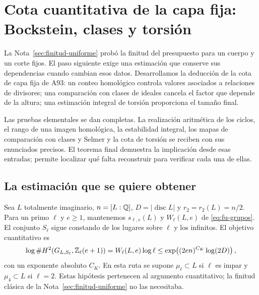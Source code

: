 \section{Cota cuantitativa de la capa fija: Bockstein, clases y torsión}
\label{sec:capa-fija}

La Nota~\ref{sec:finitud-uniforme} probó la finitud del presupuesto
para un cuerpo y un corte fijos. El paso siguiente exige una estimación
que conserve sus dependencias cuando cambian esos datos. Desarrollamos
la deducción de la cota de capa fija de A93: un conteo homológico
controla valores asociados a relaciones de divisores; una comparación
con clases de ideales cancela el factor que depende de la altura;
una estimación integral de torsión proporciona el tamaño final.

Las pruebas elementales se dan completas. La realización aritmética de
los ciclos, el rango de una imagen homológica, la estabilidad integral,
los mapas de comparación con clases y Selmer y la cota de torsión
se reciben con sus enunciados precisos. El teorema final demuestra
la implicación desde esas entradas; permite localizar qué falta
reconstruir para verificar cada una de ellas.


\subsection{La estimación que se quiere obtener}

Sea $L$ totalmente imaginario, $n=[L:\mathbb{Q}]$, $D=|\operatorname{disc}L|$
y $r_2=r_2(L)=n/2$. Para un primo $\ell$ y $e\ge1$, mantenemos
$s_{\ell,e}(L)$ y $W_\ell(L,e)$ de \eqref{eq:fu-grupos}.
El conjunto $S_\ell$ sigue constando de los lugares sobre $\ell$
y los infinitos. El objetivo cuantitativo es
\begin{equation}
 \log\#H^2(G_{L,S_\ell},\mathbb{Z}_\ell(e+1))
 =W_\ell(L,e)\log\ell
 \le \exp\!\left((2en)^{C_K}\log(2D)\right),
 \label{eq:cf-objetivo}
\end{equation}
con un exponente absoluto $C_K$. En esta ruta se supone
$\mu_\ell\subset L$ si $\ell$ es impar y $\mu_4\subset L$ si
$\ell=2$. Estas hipótesis pertenecen al argumento cuantitativo;
la finitud clásica de la Nota~\ref{sec:finitud-uniforme} no las necesitaba.

